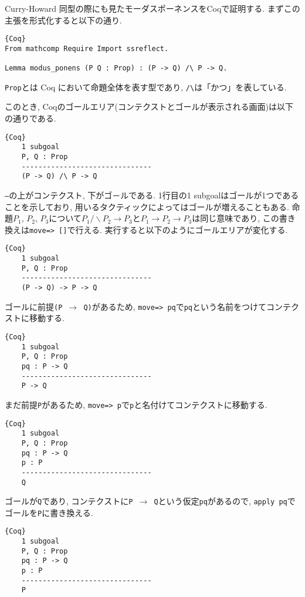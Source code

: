 \documentclass[11pt]{jsreport}
\theoremstyle{mystyle}
\newcommand{\0}{\textbf{0}}
\begin{document}
Curry-Howard 同型の際にも見たモーダスポーネンスをCoqで証明する. 
まずこの主張を形式化すると以下の通り. 
\begin{lstlisting}{Coq}
From mathcomp Require Import ssreflect.

Lemma modus_ponens (P Q : Prop) : (P -> Q) /\ P -> Q. \end{lstlisting}
{\tt Prop}とは Coq において命題全体を表す型であり, {\tt /\textbackslash}は「かつ」を表している. 

このとき, Coqのゴールエリア(コンテクストとゴールが表示される画面)は以下の通りである. 
\begin{screen}
  \begin{lstlisting}{Coq}
    1 subgoal
    P, Q : Prop
    -------------------------------
    (P -> Q) /\ P -> Q \end{lstlisting}
\end{screen}
{\tt ---}の上がコンテクスト, 下がゴ－ルである. 1行目の{1 subgoal}はゴールが1つであることを示しており, 用いるタクティックによってはゴールが増えることもある. 
命題$P_1$, $P_2$, $P_3$について$P_1 /\backslash P_2 \to P_3$と$P_1 \to P_2 \to P_3$は同じ意味であり, この書き換えは{\tt move=> []}で行える. 実行すると以下のようにゴールエリアが変化する. 
\begin{screen}
  \begin{lstlisting}{Coq}
    1 subgoal
    P, Q : Prop
    -------------------------------
    (P -> Q) -> P -> Q \end{lstlisting}
\end{screen}
ゴールに前提{\tt (P $\to$ Q)}があるため, {\tt move=> pq}で{\tt pq}という名前をつけてコンテクストに移動する. 
\begin{screen}
  \begin{lstlisting}{Coq}
    1 subgoal
    P, Q : Prop
    pq : P -> Q
    -------------------------------
    P -> Q \end{lstlisting}
\end{screen}
まだ前提{\tt P}があるため, {\tt move=> p}で{\tt p}と名付けてコンテクストに移動する. 
\begin{screen}
  \begin{lstlisting}{Coq}
    1 subgoal
    P, Q : Prop
    pq : P -> Q
    p : P
    -------------------------------
    Q \end{lstlisting}
\end{screen}
ゴールが{\tt Q}であり, コンテクストに{\tt P $\to$ Q}という仮定{\tt pq}があるので, {\tt apply pq}でゴールを{\tt P}に書き換える. 
\begin{screen}
  \begin{lstlisting}{Coq}
    1 subgoal
    P, Q : Prop
    pq : P -> Q
    p : P
    -------------------------------
    P \end{lstlisting}
\end{screen}
\end{document}
